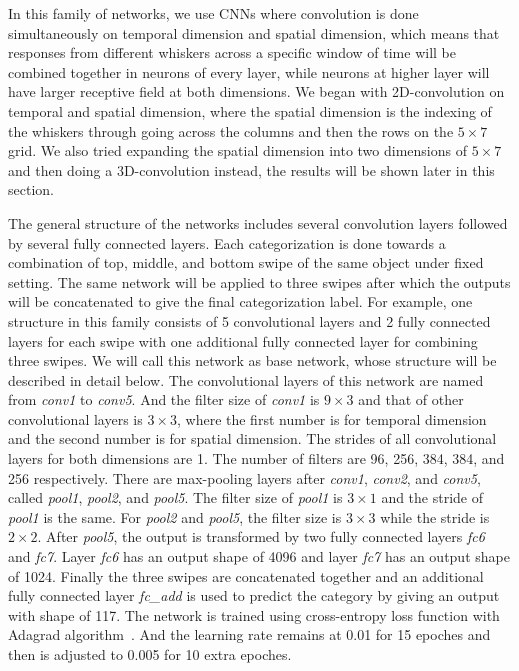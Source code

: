 In this family of networks, we use CNNs where convolution is done simultaneously on temporal dimension and spatial dimension, which means that responses from different whiskers across a specific window of time will be combined together in neurons of every layer, while neurons at higher layer will have larger receptive field at both dimensions.
We began with 2D-convolution on temporal and spatial dimension, where the spatial dimension is the indexing of the whiskers through going across the columns and then the rows on the $5\times7$ grid.
We also tried expanding the spatial dimension into two dimensions of $5\times7$ and then doing a 3D-convolution instead, the results will be shown later in this section.

The general structure of the networks includes several convolution layers followed by several fully connected layers. Each categorization is done towards a combination of top, middle, and bottom swipe of the same object under fixed setting.
The same network will be applied to three swipes after which the outputs will be concatenated to give the final categorization label.
For example, one structure in this family consists of 5 convolutional layers and 2 fully connected layers for each swipe with one additional fully connected layer for combining three swipes.
We will call this network as base network, whose structure will be described in detail below.
The convolutional layers of this network are named from \textit{conv1} to \textit{conv5}.
And the filter size of \textit{conv1} is $9\times3$ and that of other convolutional layers is $3\times3$, where the first number is for temporal dimension and the second number is for spatial dimension.
The strides of all convolutional layers for both dimensions are 1. The number of filters are 96, 256, 384, 384, and 256 respectively.
There are max-pooling layers after \textit{conv1}, \textit{conv2}, and \textit{conv5}, called \textit{pool1}, \textit{pool2}, and \textit{pool5}. The filter size of \textit{pool1} is $3\times1$ and the stride of \textit{pool1} is the same.
For \textit{pool2} and \textit{pool5}, the filter size is $3\times3$ while the stride is $2\times2$.
After \textit{pool5}, the output is transformed by two fully connected layers \textit{fc6} and \textit{fc7}. Layer \textit{fc6} has an output shape of 4096 and layer \textit{fc7} has an output shape of 1024.
Finally the three swipes are concatenated together and an additional fully connected layer \textit{fc\_add} is used to predict the category by giving an output with shape of 117.
The network is trained using cross-entropy loss function with Adagrad algorithm~\cite{duchi2011adaptive}.
And the learning rate remains at 0.01 for 15 epoches and then is adjusted to 0.005 for 10 extra epoches.

